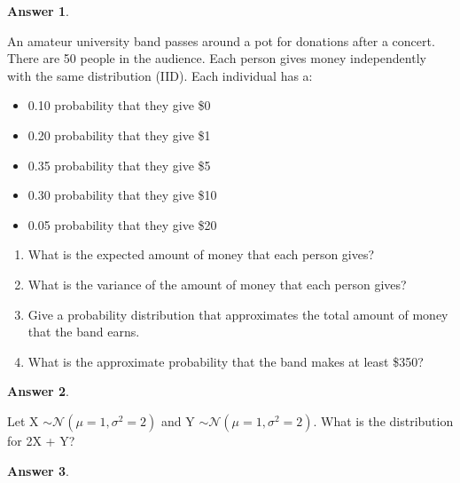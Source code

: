 \documentclass[12pt]{article}
\renewcommand{\(}{\left(}
\renewcommand{\)}{\right)}
\theoremstyle{definition}
\newtheorem*{answer}{Answer}
\begin{document}
\begin{enumerate}
{\begin{shaded}
\begin{answer}
    \end{answer}
    \end{shaded}
    \newpage
    
    \item An amateur university band passes around a pot for donations after a concert. There are 50 people in the audience. Each person gives money independently with the same distribution (IID). Each individual has a: 
    \begin{itemize}
        \item 0.10 probability that they give \$0
        \item 0.20 probability that they give \$1
        \item 0.35 probability that they give \$5
        \item 0.30 probability that they give \$10
        \item 0.05 probability that they give \$20
    \end{itemize}
    \begin{enumerate}
        \item What is the expected amount of money that each person gives?
        \item What is the variance of the amount of money that each person gives?
        \item Give a probability distribution that approximates the total amount of money that the band earns.
        \item What is the approximate probability that the band makes at least \$350?
    \end{enumerate}
    
    \begin{shaded}
    \begin{answer}
    
    \end{answer}
    \end{shaded}
    \newpage
    
    \item Let X $\sim \mathcal{N}(\mu = 1, \sigma^2 = 2)$ and Y $\sim \mathcal{N}(\mu = 1, \sigma^2 = 2)$. What is the distribution for 2X + Y?
    
    \begin{shaded}
    \begin{answer}
    
    \end{answer}
    \end{shaded}
    \newpage
    
}
\end{enumerate}
\end{document}

